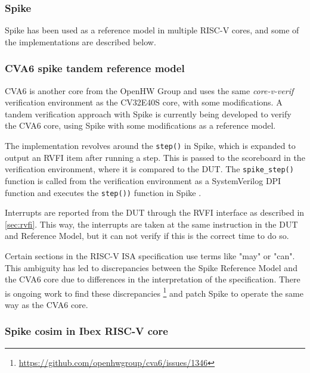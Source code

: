 \subsubsection{Spike}

Spike has been used as a reference model in multiple RISC-V cores, and some of the implementations are described below.

\subsubsection{CVA6 spike tandem reference model}
\label{back:cva6}

CVA6 is another core from the OpenHW Group and uses the same \textit{core-v-verif} verification environment as the CV32E40S core, with some modifications. A tandem verification approach with Spike is currently being developed to verify the CVA6 core, using Spike with some modifications as a reference model.

The implementation revolves around the \lstinline{step()} in Spike, which is expanded to output an RVFI item after running a step. This is passed to the scoreboard in the verification environment, where it is compared to the DUT. The \lstinline{spike_step()} function is called from the verification environment as a SystemVerilog DPI function and executes the \lstinline{step())} function in Spike \cite{openhwgroupOpenhwgroupCorevverif2023}.

Interrupts are reported from the DUT through the RVFI interface as described in \cref{sec:rvfi}. This way, the interrupts are taken at the same instruction in the DUT and Reference Model, but it can not verify if this is the correct time to do so.

Certain sections in the RISC-V ISA specification use terms like "may" or "can". This ambiguity has led to discrepancies between the Spike Reference Model and the CVA6 core due to differences in the interpretation of the specification. There is ongoing work to find these discrepancies \footnote{\url{https://github.com/openhwgroup/cva6/issues/1346}} and patch Spike to operate the same way as the CVA6 core. 


\subsubsection{Spike cosim in Ibex RISC-V core}
\label{back:Ibex}

